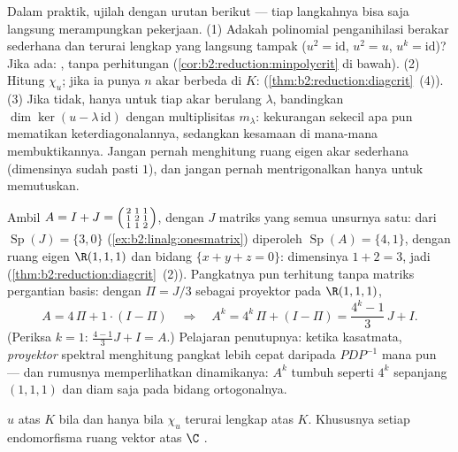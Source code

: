 \begin{method}\label{met:b2:reduction:decide}
Dalam praktik, ujilah dengan urutan berikut --- tiap langkahnya bisa
saja langsung merampungkan pekerjaan. (1) Adakah polinomial
penganihilasi berakar sederhana dan terurai lengkap yang langsung
tampak ($u^2 = \mathrm{id}$, $u^2 = u$, $u^k = \mathrm{id}$)? Jika ada:
, tanpa perhitungan
(\cref{cor:b2:reduction:minpolycrit} di bawah). (2) Hitung
$\chi_u$; jika ia punya $n$ akar berbeda di $K$: 
(\cref{thm:b2:reduction:diagcrit}~(4)). (3) Jika tidak, hanya untuk tiap
akar berulang $\lambda$, bandingkan $\dim\ker(u -
\lambda\,\mathrm{id})$ dengan multiplisitas $m_\lambda$: kekurangan
sekecil apa pun mematikan keterdiagonalannya, sedangkan kesamaan di
mana-mana membuktikannya. Jangan pernah menghitung ruang eigen akar
sederhana (dimensinya sudah pasti $1$), dan jangan pernah
mentrigonalkan hanya untuk memutuskan.
\end{method}

\begin{example}\label{ex:b2:reduction:diagwork}
Ambil $A = I + J = \begin{psmallmatrix}2 & 1 & 1\\ 1 & 2 & 1\\ 1 & 1 &
2\end{psmallmatrix}$, dengan $J$ matriks yang semua unsurnya satu: dari
$\operatorname{Sp}(J) = \{3, 0\}$
(\cref{ex:b2:linalg:onesmatrix}) diperoleh $\operatorname{Sp}(A) = \{4,
1\}$, dengan ruang eigen $\R(1,1,1)$ dan bidang $\{x + y + z =
0\}$: dimensinya $1 + 2 = 3$, jadi 
(\cref{thm:b2:reduction:diagcrit}~(2)). Pangkatnya pun terhitung tanpa
matriks pergantian basis: dengan $\Pi = J/3$ sebagai proyektor pada
$\R(1,1,1)$,
\[
A = 4\,\Pi + 1\cdot(I - \Pi)
\quad\Longrightarrow\quad
A^k = 4^k\,\Pi + (I - \Pi)
= \frac{4^k - 1}{3}\,J + I .
\]
(Periksa $k = 1$: $\frac{4-1}3 J + I = A$.) Pelajaran penutupnya:
ketika  kasatmata, \emph{proyektor} spektral
menghitung pangkat lebih cepat daripada $PDP^{-1}$ mana pun --- dan
rumusnya memperlihatkan dinamikanya: $A^k$ tumbuh seperti $4^k$
sepanjang $(1,1,1)$ dan diam saja pada bidang ortogonalnya.
\end{example}

\begin{theorem}[Trigonalisasi]\label{thm:b2:reduction:trigonalization}
$u$  atas $K$ bila dan hanya bila $\chi_u$ terurai
lengkap atas $K$. Khususnya setiap endomorfisma ruang vektor atas $\C$
.
\end{theorem}

